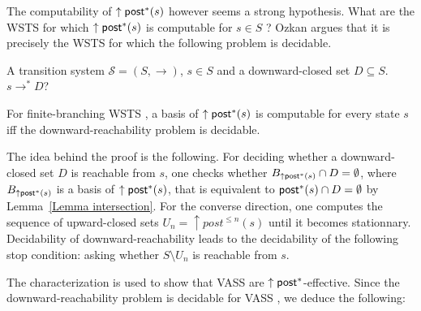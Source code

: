 The computability of $\uparrow \textsf{post}^*(s)$ however seems a strong hypothesis. What are the WSTS for which $\uparrow \textsf{post}^*(s)$ is computable for $s \in S$ ?
Ozkan \cite{DBLP:conf/gg/Ozkan22} argues that it is precisely the WSTS for which the following problem is decidable.

{A transition system $\mathscr{S}=(S,\rightarrow)$, $s \in S$ and a downward-closed set $D
\subseteq S$.}
{$s  \to^* D$? \newline}

\begin{proposition}\label{post*}
For finite-branching WSTS%
, a basis of $\uparrow \textsf{post}^*(s)$ is computable for every state $s$ iff the downward-reachability problem is decidable.
\end{proposition}

The idea behind the proof is the following. For deciding whether a downward-closed set $D$ is reachable from $s$, one checks whether
$B_{\uparrow \textsf{post}^*(s)} \cap D = \emptyset$, 
where $B_{\uparrow \textsf{post}^*(s)}$ is a basis of $\uparrow \textsf{post}^*(s)$,
 that is equivalent to $\textsf{post}^*(s)\cap D = \emptyset$ by
Lemma~\ref{Lemma intersection}. For the converse direction, one computes the sequence of upward-closed sets
$U_n = \uparrow post^{\leq n}(s)$ until it becomes stationnary. 
Decidability of downward-reachability leads to the decidability of the following stop condition:
asking whether $S \setminus U_n$ is reachable from $s$.


The characterization is used to show that VASS are $\uparrow \textsf{post}^*$-effective. Since the downward-reachability problem is decidable for VASS , we  
deduce the following:


